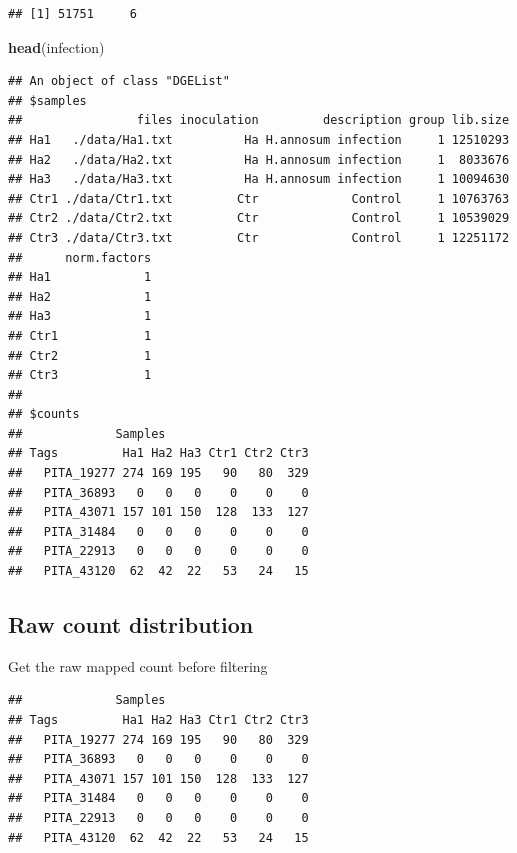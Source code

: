 \documentclass[
]{article}
\newenvironment{Shaded}{\begin{snugshade}}{\end{snugshade}}
\newcommand{\FunctionTok}[1]{\textcolor[rgb]{0.13,0.29,0.53}{\textbf{#1}}}
\newcommand{\NormalTok}[1]{#1}
\newcommand{\OtherTok}[1]{\textcolor[rgb]{0.56,0.35,0.01}{#1}}
\newcommand{\SpecialCharTok}[1]{\textcolor[rgb]{0.81,0.36,0.00}{\textbf{#1}}}
\begin{document}
\begin{verbatim}
## [1] 51751     6
\end{verbatim}

\begin{Shaded}
\begin{Highlighting}[]
\FunctionTok{head}\NormalTok{(infection)}
\end{Highlighting}
\end{Shaded}

\begin{verbatim}
## An object of class "DGEList"
## $samples
##                files inoculation         description group lib.size
## Ha1   ./data/Ha1.txt          Ha H.annosum infection     1 12510293
## Ha2   ./data/Ha2.txt          Ha H.annosum infection     1  8033676
## Ha3   ./data/Ha3.txt          Ha H.annosum infection     1 10094630
## Ctr1 ./data/Ctr1.txt         Ctr             Control     1 10763763
## Ctr2 ./data/Ctr2.txt         Ctr             Control     1 10539029
## Ctr3 ./data/Ctr3.txt         Ctr             Control     1 12251172
##      norm.factors
## Ha1             1
## Ha2             1
## Ha3             1
## Ctr1            1
## Ctr2            1
## Ctr3            1
## 
## $counts
##             Samples
## Tags         Ha1 Ha2 Ha3 Ctr1 Ctr2 Ctr3
##   PITA_19277 274 169 195   90   80  329
##   PITA_36893   0   0   0    0    0    0
##   PITA_43071 157 101 150  128  133  127
##   PITA_31484   0   0   0    0    0    0
##   PITA_22913   0   0   0    0    0    0
##   PITA_43120  62  42  22   53   24   15
\end{verbatim}

\subsection{Raw count distribution}\label{raw-count-distribution}

Get the raw mapped count before filtering

\begin{Shaded}
\end{Shaded}

\begin{verbatim}
##             Samples
## Tags         Ha1 Ha2 Ha3 Ctr1 Ctr2 Ctr3
##   PITA_19277 274 169 195   90   80  329
##   PITA_36893   0   0   0    0    0    0
##   PITA_43071 157 101 150  128  133  127
##   PITA_31484   0   0   0    0    0    0
##   PITA_22913   0   0   0    0    0    0
##   PITA_43120  62  42  22   53   24   15
\end{verbatim}
\end{document}
